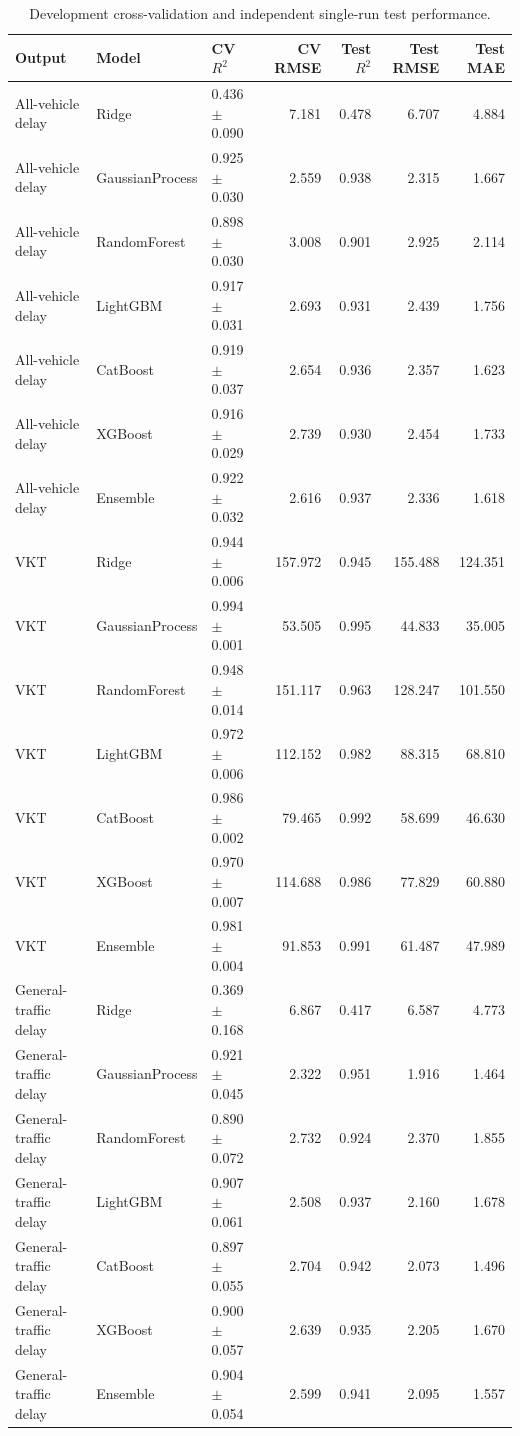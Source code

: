 \begin{table}[!htbp]
\centering
\small
\caption{Development cross-validation and independent single-run test performance.}
\label{tab:performance}
\begin{tabular}{lllrrrr}
\toprule
Output & Model & CV $R^2$ & CV RMSE & Test $R^2$ & Test RMSE & Test MAE \\
\midrule
All-vehicle delay & Ridge & 0.436 $\pm$ 0.090 & 7.181 & 0.478 & 6.707 & 4.884 \\
All-vehicle delay & GaussianProcess & 0.925 $\pm$ 0.030 & 2.559 & 0.938 & 2.315 & 1.667 \\
All-vehicle delay & RandomForest & 0.898 $\pm$ 0.030 & 3.008 & 0.901 & 2.925 & 2.114 \\
All-vehicle delay & LightGBM & 0.917 $\pm$ 0.031 & 2.693 & 0.931 & 2.439 & 1.756 \\
All-vehicle delay & CatBoost & 0.919 $\pm$ 0.037 & 2.654 & 0.936 & 2.357 & 1.623 \\
All-vehicle delay & XGBoost & 0.916 $\pm$ 0.029 & 2.739 & 0.930 & 2.454 & 1.733 \\
All-vehicle delay & Ensemble & 0.922 $\pm$ 0.032 & 2.616 & 0.937 & 2.336 & 1.618 \\
VKT & Ridge & 0.944 $\pm$ 0.006 & 157.972 & 0.945 & 155.488 & 124.351 \\
VKT & GaussianProcess & 0.994 $\pm$ 0.001 & 53.505 & 0.995 & 44.833 & 35.005 \\
VKT & RandomForest & 0.948 $\pm$ 0.014 & 151.117 & 0.963 & 128.247 & 101.550 \\
VKT & LightGBM & 0.972 $\pm$ 0.006 & 112.152 & 0.982 & 88.315 & 68.810 \\
VKT & CatBoost & 0.986 $\pm$ 0.002 & 79.465 & 0.992 & 58.699 & 46.630 \\
VKT & XGBoost & 0.970 $\pm$ 0.007 & 114.688 & 0.986 & 77.829 & 60.880 \\
VKT & Ensemble & 0.981 $\pm$ 0.004 & 91.853 & 0.991 & 61.487 & 47.989 \\
General-traffic delay & Ridge & 0.369 $\pm$ 0.168 & 6.867 & 0.417 & 6.587 & 4.773 \\
General-traffic delay & GaussianProcess & 0.921 $\pm$ 0.045 & 2.322 & 0.951 & 1.916 & 1.464 \\
General-traffic delay & RandomForest & 0.890 $\pm$ 0.072 & 2.732 & 0.924 & 2.370 & 1.855 \\
General-traffic delay & LightGBM & 0.907 $\pm$ 0.061 & 2.508 & 0.937 & 2.160 & 1.678 \\
General-traffic delay & CatBoost & 0.897 $\pm$ 0.055 & 2.704 & 0.942 & 2.073 & 1.496 \\
General-traffic delay & XGBoost & 0.900 $\pm$ 0.057 & 2.639 & 0.935 & 2.205 & 1.670 \\
General-traffic delay & Ensemble & 0.904 $\pm$ 0.054 & 2.599 & 0.941 & 2.095 & 1.557 \\
\bottomrule
\end{tabular}
\end{table}

